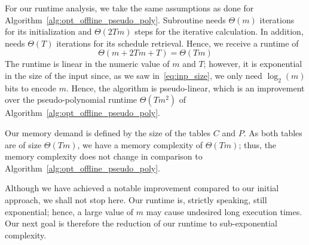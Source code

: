 For our runtime analysis, we take the same assumptions as done for Algorithm~\ref{alg:opt_offline_pseudo_poly}. Subroutine  needs $\Theta(m)$ iterations for its initialization and $\Theta(2Tm)$ steps for the iterative calculation. In addition,  needs $\Theta(T)$ iterations for its schedule retrieval. Hence, we receive a runtime of 
\begin{equation*}
	\Theta(m+2Tm+T)=\Theta(Tm)
\end{equation*}
The runtime is linear in the numeric value of $m$ and $T$; however, it is exponential in the size of the input since, as we saw in~\eqref{eq:inp_size}, we only need $\log_2(m)$ bits to encode $m$. Hence, the algorithm is pseudo-linear, which is an improvement over the pseudo-polynomial runtime $\Theta(Tm^2)$ of Algorithm~\ref{alg:opt_offline_pseudo_poly}.

Our memory demand is defined by the size of the tables $C$ and $P$. As both tables are of size $\Theta(Tm)$, we have a memory complexity of $\Theta(Tm)$; thus, the memory complexity does not change in comparison to Algorithm~\ref{alg:opt_offline_pseudo_poly}.

Although we have achieved a notable improvement compared to our initial approach, we shall not stop here. Our runtime is, strictly speaking, still exponential; hence, a large value of $m$ may cause undesired long execution times. Our next goal is therefore the reduction of our runtime to sub-exponential complexity.
